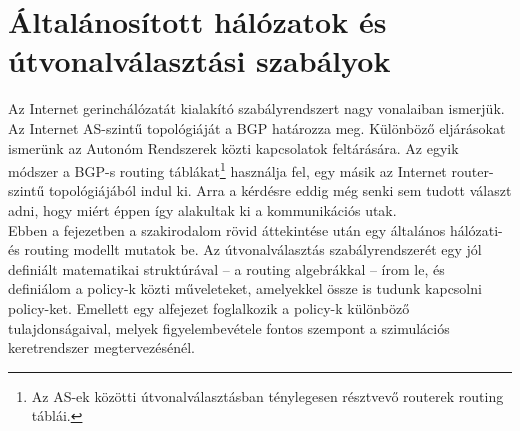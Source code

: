 \newtheorem{definition}{Definíció}
\newtheorem{conjecture}{Sejtés}
\newtheorem{lemma}{Lemma}
\newtheorem{theorem}{Tétel}
\newtheorem{note}{Megjegyzés}


\chapter{Általánosított hálózatok és útvonalválasztási szabályok}\label{modell}
Az Internet gerinchálózatát kialakító szabályrendszert nagy vonalaiban ismerjük. Az Internet AS-szintű topológiáját a BGP határozza meg. Különböző eljárásokat ismerünk az Autonóm Rendszerek közti kapcsolatok feltárására. Az egyik módszer a BGP-s routing táblákat\footnote{Az AS-ek közötti útvonalválasztásban ténylegesen résztvevő routerek routing táblái.} használja fel, egy másik az Internet router-szintű topológiájából indul ki. Arra a kérdésre eddig még senki sem tudott választ adni, hogy miért éppen így alakultak ki a kommunikációs utak.\\

Ebben a fejezetben a szakirodalom rövid áttekintése után egy általános hálózati- és routing modellt mutatok be. Az útvonalválasztás szabályrendszerét egy jól definiált matematikai struktúrával -- a routing algebrákkal -- írom le, és definiálom a policy-k közti műveleteket, amelyekkel össze is tudunk kapcsolni policy-ket. Emellett egy alfejezet foglalkozik a policy-k különböző tulajdonságaival, melyek figyelembevétele fontos szempont a szimulációs keretrendszer megtervezésénél.

